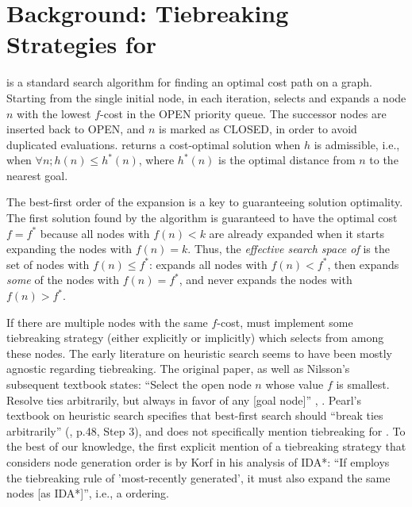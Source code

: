 \section{Background: Tiebreaking Strategies for \astar}

\label{sec:astar-background}

\astar is a standard search algorithm for finding an optimal cost path
on a graph.
Starting from the single initial node, in each iteration, \astar
selects and expands a node $n$ with the lowest $f$-cost in the OPEN
priority queue. The successor nodes are inserted back to OPEN, and $n$
is marked as CLOSED, in order to avoid duplicated evaluations.
\astar returns a cost-optimal solution when $h$ is admissible, i.e., when
$\forall n; h(n) \leq h^*(n)$, where $h^*(n)$ is the optimal distance from $n$ to
the nearest goal.

The best-first order of the expansion is a key to guaranteeing solution optimality. 
The first solution found by the algorithm is guaranteed to have the optimal cost $f=f^*$ because 
all nodes with $f(n) < k$ are already expanded when it starts expanding
the nodes with $f(n) = k$.
Thus, the \emph{effective search space of \astar} is the set of nodes with 
$f(n) \leq f^*$: \astar expands all nodes with $f(n) < f^*$, then
expands \emph{some} of the nodes with $f(n) = f^*$, and
never expands the nodes with $f(n) > f^*$.

If there are multiple nodes with the same $f$-cost, \astar
must implement some tiebreaking strategy (either
explicitly or implicitly) which selects from among these nodes.
The early literature on heuristic search seems to have been mostly agnostic regarding tiebreaking.
The original \astar paper, as well as Nilsson's subsequent textbook 
states: ``Select the open node $n$ whose value $f$
is smallest. Resolve ties arbitrarily, but always in favor of any [goal
node]'' \cite[p.102 Step 2]{hart1968formal}, \cite[p.69]{Nilsson71}.
Pearl's textbook on heuristic search specifies that best-first search should ``break ties arbitrarily'' (\citeyear{pearl1984heuristics}, p.48, Step 3), and does not specifically mention tiebreaking for \astar.
To the best of our knowledge, the first explicit mention of a tiebreaking strategy that considers node generation order is by Korf in his analysis of IDA*: ``If \astar employs the tiebreaking rule of 'most-recently generated', it must also expand the same nodes [as IDA*]'', i.e., a \lifo ordering.

